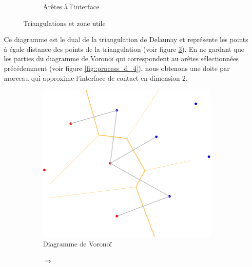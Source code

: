 \begin{figure}[ht]
\begin{subfigure}{0.45\textwidth}
  \caption{Arêtes à l'interface}
  \label{fig::process_d_2}
\end{subfigure}
\caption{Triangulations et zone utile}
\label{fig::delaunays_process_1}
\end{figure}


Ce diagramme est le dual de la triangulation de Delaunay et représente les points à
égale distance des points de la triangulation (voir figure \ref{fig::process_d_3}).
En ne gardant que les parties du diagramme de Voronoï qui correspondent au arêtes sélectionnées
précédemment (voir figure \ref{fig::process_d_4}), nous obtenons une doite par morceau
qui approxime l'interface de contact en dimension 2.

\begin{figure}[ht]
\centering
\begin{subfigure}{0.45\textwidth}
  \centering
  \includegraphics[width=\textwidth]{figures/process_d_3.png}
  \caption{Diagramme de Voronoï}
  \label{fig::process_d_3}
\end{subfigure}%
\begin{subfigure}{0.1\textwidth}
  \centering
  $\Longrightarrow$
\end{subfigure}%
\begin{subfigure}{0.45\textwidth}
  \centering

\end{subfigure}
\end{figure}
